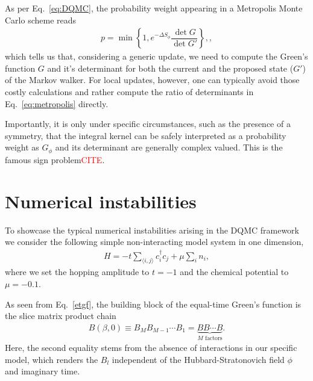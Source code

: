 \documentclass[%
 reprint,
superscriptaddress,
citeautoscript,
showpacs,
 amsmath,amssymb,
 aps,
 prb,
longbibliography,
]{revtex4-2}
\begin{document}
As per Eq.~\eqref{eq:DQMC}, the probability weight appearing in a Metropolis Monte Carlo scheme reads
\begin{align}
p = \min \left\{ 1 , e^{-\Delta S_\phi}  \dfrac{\det G}{\det G'} \right\}, \label{eq:metropolis},
\end{align}
which tells us that, considering a generic update, we need to compute the Green's function $G$ and it's determinant for both the current and the proposed state ($G'$) of the Markov walker. For local updates, however, one can typically avoid those costly calculations and rather compute the ratio of determinants in Eq.~\eqref{eq:metropolis} directly.

Importantly, it is only under specific circumstances, such as the presence of a symmetry, that the integral kernel can be safely interpreted as a probability weight as $G_\phi$ and its determinant are generally complex valued. This is the famous sign problem\textcolor{red}{CITE}.

\section{Numerical instabilities}\label{sec:instabilities}

To showcase the typical numerical instabilities arising in the DQMC framework we consider the following simple non-interacting model system in one dimension,
\begin{align}
	H = -t\sum_{\langle i,j \rangle} c_i^\dagger c_j + \mu \sum_i n_i \label{eq:model},
\end{align}
where we set the hopping amplitude to $t=-1$ and the chemical potential to $\mu=-0.1$.



As seen from Eq.~\eqref{etgf}, the building block of the equal-time Green's function is the slice matrix product chain
\begin{align}
B(\beta, 0) \equiv B_M B_{M-1} \cdots B_1 = \underbrace{B B \cdots B}_{M \textrm{ factors}}. \label{eq:Bchain}
\end{align}
Here, the second equality stems from the absence of interactions in our specific model, which renders the $B_l$ independent of the Hubbard-Stratonovich field $\phi$ and imaginary time.
\end{document}
